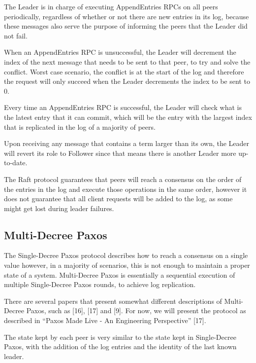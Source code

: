 The Leader is in charge of executing AppendEntries RPCs on all peers periodically, regardless of whether or not there are new entries in its log, because these messages also serve the purpose of informing the peers that the Leader did not fail.

When an AppendEntries RPC is unsuccessful, the Leader will decrement the index of the next message that needs to be sent to that peer, to try and solve the conflict. Worst case scenario, the conflict is at the start of the log and therefore the request will only succeed when the Leader decrements the index to be sent to 0.

Every time an AppendEntries RPC is successful, the Leader will check what is the latest entry that it can commit, which will be the entry with the largest index that is replicated in the log of a majority of peers.

Upon receiving any message that contains a term larger than its own, the Leader will revert its role to Follower since that means there is another Leader more up-to-date.

\vspace{0.5cm}

The Raft protocol guarantees that peers will reach a consensus on the order of the entries in the log and execute those operations in the same order, however it does not guarantee that all client requests will be added to the log, as some might get lost during leader failures.



\subsection{Multi-Decree Paxos}

The Single-Decree Paxos protocol describes how to reach a consensus on a single value however, in a majority of scenarios, this is not enough to maintain a proper state of a system. Multi-Decree Paxos is essentially a sequential execution of multiple Single-Decree Paxos rounds, to achieve log replication. 

There are several papers that present somewhat different descriptions of Multi-Decree Paxos, such as [16], [17] and [9]. For now, we will present the protocol as described in “Paxos Made Live - An Engineering Perspective” [17].

The state kept by each peer is very similar to the state kept in Single-Decree Paxos, with the addition of the log entries and the identity of the last known leader.

